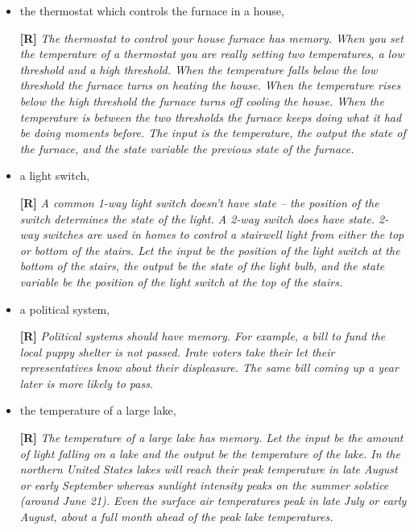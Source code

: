 \begin{enumerate}
\begin{itemize}
    \item  the thermostat which controls the furnace in a house,
    
      \begin{onlysolution}
        \textbf{[R]}
        \itshape
        The thermostat to control your house furnace has memory. When you set the temperature of a thermostat you are 
        really setting two temperatures, a low threshold and a high threshold. When the temperature falls below the low 
        threshold the furnace turns on heating the house. When the temperature rises below the high threshold the 
        furnace turns off cooling the house. When the temperature is between the two thresholds the furnace keeps doing 
        what it had be doing moments before. The input is the temperature, the output the state of the furnace, and the 
        state variable the previous state of the furnace.
      \end{onlysolution}

    \item a light switch, 

      \begin{onlysolution}
        \textbf{[R]}
        \itshape
        A common 1-way light switch doesn’t have state – the position of the switch determines the state of the light. 
        A 2-way switch does have state. 2-way switches are used in homes to control a stairwell light from either the 
        top or bottom of the stairs. Let the input be the position of the light switch at the bottom of the stairs, 
        the output be the state of the light bulb, and the state variable be the position of the light switch at the 
        top of the stairs.
      \end{onlysolution}

    \item a political system,

      \begin{onlysolution}
        \textbf{[R]}
        \itshape
        Political systems should have memory. For example, a bill to fund the local puppy shelter is not passed. Irate 
        voters take their let their representatives know about their displeasure. The same bill coming up a year later 
        is more likely to pass.
      \end{onlysolution}

    \item the temperature of a large lake, 

      \begin{onlysolution}
        \textbf{[R]}
        \itshape
        The temperature of a large lake has memory. Let the input be the amount of light falling on a lake and the output 
        be the temperature of the lake. In the northern United States lakes will reach their peak temperature in late August 
        or early September whereas sunlight intensity peaks on the summer solstice (around June 21). Even the surface air 
        temperatures peak in late July or early August, about a full month ahead of the peak lake temperatures.
      \end{onlysolution}


\end{itemize}
\end{enumerate}
